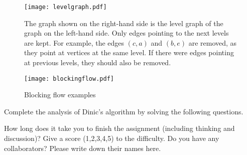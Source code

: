 \documentclass{oxmathproblems}
\begin{document}
\begin{questions}
\begin{figure}[ht]
    \centering
    \texttt{[image: levelgraph.pdf]}
    \caption{The graph shown on the right-hand side is the level graph of the graph on the left-hand side. Only edges pointing to the next levels are kept. For example, the edges $(c,a)$ and $(b,e)$ are removed, as they point at vertices at the same level. If there were edges pointing at previous levels, they should also be removed.}
    \label{fig:levelgraph}
\end{figure}

\begin{figure}[ht]
    \centering
    \texttt{[image: blockingflow.pdf]}
    \caption{Blocking flow examples}
    \label{fig:blockingflow}
\end{figure}

Complete the analysis of Dinic's algorithm by solving the following questions.
  
\miquestion
How long does it take you to finish the assignment (including thinking and discussion)?
Give a score (1,2,3,4,5) to the difficulty.
Do you have any collaborators?
Please write down their names here.
 

\end{questions}
\end{document}
